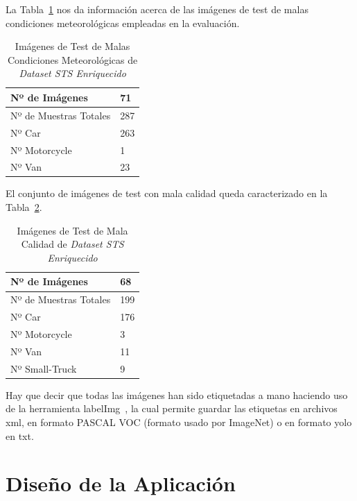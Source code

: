 La Tabla~\ref{tab_img_test_malas_condiciones} nos da información acerca de las imágenes de test de malas condiciones meteorológicas empleadas en la evaluación.
\begin{table}[H] 
\begin{center}
\begin{tabular}{|l|l|}
\hline
Nº de Imágenes  & 71 \\
\hline \hline
Nº de Muestras Totales & 287\\ \hline
Nº Car & 263 \\ \hline
Nº Motorcycle & 1 \\ \hline
Nº Van & 23 \\ \hline
\end{tabular}
\caption{Imágenes de Test de Malas Condiciones Meteorológicas de \textit{Dataset STS Enriquecido}}
\label{tab_img_test_malas_condiciones}
\end{center}
\end{table}

El conjunto de imágenes de test con mala calidad queda caracterizado en la Tabla~\ref{tab_img_test_mala_calidad}.

\begin{table}[H] 
\begin{center}
\begin{tabular}{|l|l|}
\hline
Nº de Imágenes  & 68 \\
\hline \hline
Nº de Muestras Totales & 199\\ \hline
Nº Car & 176 \\ \hline
Nº Motorcycle & 3 \\ \hline
Nº Van & 11 \\ \hline
Nº Small-Truck & 9 \\ \hline
\end{tabular}
\caption{Imágenes de Test de Mala Calidad de \textit{Dataset STS Enriquecido}}
\label{tab_img_test_mala_calidad}
\end{center}
\end{table}


Hay que decir que todas las imágenes han sido etiquetadas a mano haciendo uso de la herramienta labelImg~\cite{labelimg}, la cual permite guardar las etiquetas en archivos xml, en formato PASCAL VOC (formato usado por ImageNet) o en formato \acrshort{yolo} en txt.

\section{Diseño de la Aplicación}

